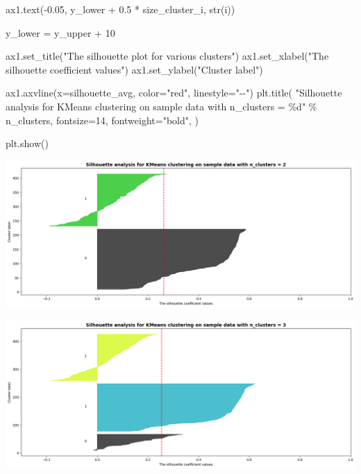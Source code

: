 \documentclass[
  11pt,
  letterpaper,
  DIV=11,
  numbers=noendperiod]{scrartcl}
\newenvironment{Shaded}{\begin{snugshade}}{\end{snugshade}}
\newcommand{\BuiltInTok}[1]{\textcolor[rgb]{0.00,0.23,0.31}{#1}}
\newcommand{\DecValTok}[1]{\textcolor[rgb]{0.68,0.00,0.00}{#1}}
\newcommand{\FloatTok}[1]{\textcolor[rgb]{0.68,0.00,0.00}{#1}}
\newcommand{\NormalTok}[1]{\textcolor[rgb]{0.00,0.23,0.31}{#1}}
\newcommand{\OperatorTok}[1]{\textcolor[rgb]{0.37,0.37,0.37}{#1}}
\newcommand{\SpecialCharTok}[1]{\textcolor[rgb]{0.37,0.37,0.37}{#1}}
\newcommand{\StringTok}[1]{\textcolor[rgb]{0.13,0.47,0.30}{#1}}
\begin{document}
\begin{Shaded}
\begin{Highlighting}[]
\NormalTok{        ax1.text(}\OperatorTok{{-}}\FloatTok{0.05}\NormalTok{, y\_lower }\OperatorTok{+} \FloatTok{0.5} \OperatorTok{*}\NormalTok{ size\_cluster\_i, }\BuiltInTok{str}\NormalTok{(i))}

\NormalTok{        y\_lower }\OperatorTok{=}\NormalTok{ y\_upper }\OperatorTok{+} \DecValTok{10}  

\NormalTok{    ax1.set\_title(}\StringTok{"The silhouette plot for various clusters"}\NormalTok{)}
\NormalTok{    ax1.set\_xlabel(}\StringTok{"The silhouette coefficient values"}\NormalTok{)}
\NormalTok{    ax1.set\_ylabel(}\StringTok{"Cluster label"}\NormalTok{)}

\NormalTok{    ax1.axvline(x}\OperatorTok{=}\NormalTok{silhouette\_avg, color}\OperatorTok{=}\StringTok{"red"}\NormalTok{, linestyle}\OperatorTok{=}\StringTok{"{-}{-}"}\NormalTok{)}
\NormalTok{    plt.title(}
        \StringTok{"Silhouette analysis for KMeans clustering on sample data with n\_clusters = }\SpecialCharTok{\%d}\StringTok{"}
        \OperatorTok{\%}\NormalTok{ n\_clusters,}
\NormalTok{        fontsize}\OperatorTok{=}\DecValTok{14}\NormalTok{,}
\NormalTok{        fontweight}\OperatorTok{=}\StringTok{"bold"}\NormalTok{,}
\NormalTok{    )}

\NormalTok{plt.show()}
\end{Highlighting}
\end{Shaded}

\includegraphics{assignment6111_files/figure-pdf/cell-29-output-1.png}

\includegraphics{assignment6111_files/figure-pdf/cell-29-output-2.png}
\end{document}
